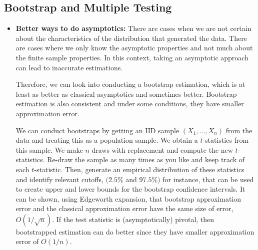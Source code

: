 \documentclass[12pt]{article}
\theoremstyle{definition}
\theoremstyle{property}
\theoremstyle{assumption}
\theoremstyle{example}
\theoremstyle{comment}
\begin{document}
\subsection{Bootstrap and Multiple Testing}
\begin{itemize}
\item \textbf{Better ways to do asymptotics:} There are cases when we are not certain about the characteristics of the distribution that generated the data. There are cases where we only know the asymptotic properties and not much about the finite sample properties. In this context, taking an asymptotic approach can lead to inaccurate estimations. \par
Therefore, we can look into conducting a bootstrap estimation, which is at least as better as classical asymptotics and sometimes better. Bootstrap estimation is also consistent and under some conditions, they have smaller approximation error. \par
We can conduct bootstraps by getting an IID sample $(X_1,...,X_n)$ from the data and treating this as a population sample. We obtain a $t$-statistics from this sample. We make $n$ draws with replacement and compute the new $t$-statistics. Re-draw the sample as many times as you like and keep track of each $t$-statistic. Then, generate an empirical distribution of these statistics and identify relevant cutoffs, $(2.5\%$ and $97.5\%)$ for instance, that can be used to create upper and lower bounds for the bootstrap confidence intervals. It can be shown, using Edgeworth expansion, that bootstrap approximation error and the classical approximation error have the same size of error, $O\left(1/\sqrt{n}\right)$. If the test statistic is (asymptotically) pivotal, then bootstrapped estimation can do better since they have smaller approximation error of $O\left(1/n\right)$.


\end{itemize}
\end{document}
